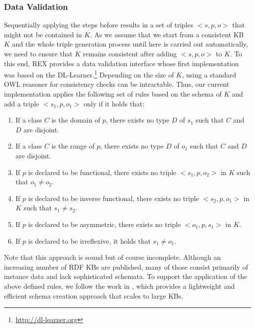 \subsubsection{Data Validation}\label{axioms}
Sequentially applying the steps before results in a set of triples $<s,p,o>$ that might not be contained in $K$. 
As we assume that we start from a consistent  \ac{KB} $K$ and the whole triple generation process until here is carried out automatically, we need to ensure that $K$ remains consistent after adding $<s,p,o>$ to $K$.
To this end, REX provides a data validation interface whose first implementation was based on the DL-Learner.\footnote{\url{http://dl-learner.org}}
Depending on the size of $K$, using a standard OWL reasoner for consistency checks can be intractable.
Thus, our current implementation applies the following set of rules based on the schema of $K$ and add a triple $<s_1,p,o_1>$ only if it holds that:
\begin{enumerate}
\item If a class $C$ is the domain of $p$, there exists no type $D$ of $s_1$ such that $C$ and $D$ are disjoint.
\item If a class $C$ is the range of $p$, there exists no type $D$ of $o_1$ such that $C$ and $D$ are disjoint.
\item If $p$ is declared to be functional, there exists no triple $<s_1,p,o_2>$ in $K$ such that $o_1 \neq o_2$.
\item If $p$ is declared to be inverse functional, there exists no triple $<s_2,p,o_1>$ in $K$ such that $s_1 \neq s_2$.
\item If $p$ is declared to be asymmetric, there exists no triple $<o_1,p,s_1>$ in $K$.
\item If $p$ is declared to be irreflexive, it holds that $s_1 \neq o_1$.
\end{enumerate}
Note that this approach is sound but of course incomplete.
Although an increasing number of \ac{RDF}  \ac{KB}s are published, many of those consist primarily of instance data and lack sophisticated schemata. 
To support the application of the above defined rules, we follow the work in \cite{buhmann2012,pattern_enrichment}, which provides a lightweight and efficient schema creation approach that scales to large  \ac{KB}s. 


